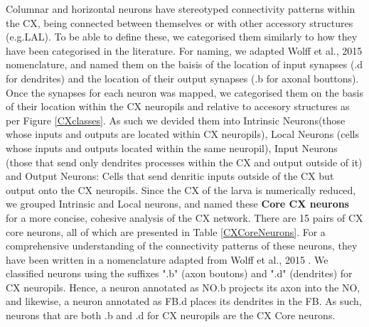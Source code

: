 Columnar and horizontal neurons have stereotyped connectivity patterns within the CX, being connected between themselves or with other accessory structures (e.g.LAL). To be able to define these, we categorised them similarly to how they have been categorised in the literature. For naming, we adapted Wolff et al., 2015 nomenclature, and named them on the baisis of the location of input synapses (.d for dendrites) and the location of their output synapses (.b for axonal bouttons). Once the synapses for each neuron was mapped, we categorised them on the basis of their location within the CX neuropils and relative to accesory structures as per Figure \ref{CXclasses}.  As such we devided them into Intrinsic Neurons(those whose inputs and outputs are located within CX neuropils), Local Neurons (cells whose inputs and outputs located within the same neuropil), Input Neurons (those that send only dendrites processes within the CX and output outside of it) and Output Neurons: Cells that send denritic inputs outside of the CX but output onto the CX neuropils. Since the CX of the larva is numerically reduced, we grouped Intrinsic and Local neurons, and named these \textbf{Core CX neurons} for a more concise, cohesive analysis of the CX network. There are 15 pairs of CX core neurons, all of which are presented in Table \ref{CXCoreNeurons}. For a comprehensive understanding of the connectivity patterns of these neurons, they have been written in a nomenclature adapted from Wolff et al., 2015 \citep{wolff2015neuroarchitecture}. We classified neurons using the suffixes ".b" (axon boutons) and ".d" (dendrites) for CX neuropils.
Hence, a neuron annotated as NO.b projects its axon into the NO, and likewise, a neuron annotated as FB.d places its dendrites in the FB.
As such, neurons that are both .b and .d for CX neuropils are the CX Core neurons. 



